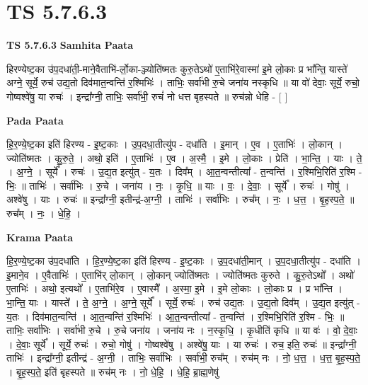 \documentclass[17pt]{extarticle}
\begin{document}
\section{ TS 5.7.6.3 }

\textbf{TS 5.7.6.3 } \newline
\textbf{Samhita Paata} \newline

हिरण्येष्ट॒का उ॑प॒दधा॑ती॒-माने॒वैताभि॑-र्लो॒का-ञ्ज्योति॑ष्मतः कुरु॒तेऽथो॑ ए॒ताभि॑रे॒वास्मा॑ इ॒मे लो॒काः प्र भा᳚न्ति॒ यास्ते॑ अग्ने॒ सूर्ये॒ रुच॑ उद्य॒तो दिव॑मात॒न्वन्ति॑ र॒श्मिभिः॑ । ताभिः॒ सर्वा॑भी रु॒चे जना॑य नस्कृधि ॥ या वो॑ देवाः॒ सूर्ये॒ रुचो॒ गोष्वश्वे॑षु॒ या रुचः॑ । इन्द्रा᳚ग्नी॒ ताभिः॒ सर्वा॑भी॒ रुचं॑ नो धत्त बृहस्पते ॥ रुच॑न्नो धेहि - [  ] \newline

\textbf{Pada Paata} \newline

हि॒र॒ण्ये॒ष्ट॒का इति॑ हिरण्य - इ॒ष्ट॒काः । उ॒प॒दधा॒तीत्यु॑प - दधा॑ति । इ॒मान् । ए॒व । ए॒ताभिः॑ । लो॒कान् । ज्योति॑ष्मतः । कु॒रु॒ते॒ । अथो॒ इति॑ । ए॒ताभिः॑ । ए॒व । अ॒स्मै॒ । इ॒मे । लो॒काः । प्रेति॑ । भा॒न्ति॒ । याः । ते॒ । अ॒ग्ने॒ । सूर्ये᳚ । रुचः॑ । उ॒द्य॒त इत्यु॑त् - य॒तः । दिव᳚म् । आ॒त॒न्वन्तीत्या᳚ - त॒न्वन्ति॑ । र॒श्मिभि॒रिति॑ र॒श्मि - भिः॒ ॥ ताभिः॑ । सर्वा॑भिः । रु॒चे । जना॑य । नः॒ । कृ॒धि॒ ॥ याः । वः॒ । दे॒वाः॒ । सूर्ये᳚ । रुचः॑ । गोषु॑ । अश्वे॑षु । याः । रुचः॑ ॥ इन्द्रा᳚ग्नी॒ इतीन्द्र॑-अ॒ग्नी॒ । ताभिः॑ । सर्वा॑भिः । रुच᳚म् । नः॒ । ध॒त्त॒ । बृ॒ह॒स्प॒ते॒ ॥ रुच᳚म् । नः॒ । धे॒हि॒ ।  \newline


\textbf{Krama Paata} \newline

हि॒र॒ण्ये॒ष्ट॒का उ॑प॒दधा॑ति । हि॒र॒ण्ये॒ष्ट॒का इति॑ हिरण्य - इ॒ष्ट॒काः । उ॒प॒दधा॑ती॒मान् । उ॒प॒दधा॒तीत्यु॑प - दधा॑ति । इ॒माने॒व । ए॒वैताभिः॑ । ए॒ताभि॑र् लो॒कान् । लो॒कान् ज्योति॑ष्मतः । ज्योति॑ष्मतः कुरुते । कु॒रु॒तेऽथो᳚ । अथो॑ ए॒ताभिः॑ । अथो॒ इत्यथो᳚ । ए॒ताभि॑रे॒व । ए॒वास्मै᳚ । अ॒स्मा॒ इ॒मे । इ॒मे लो॒काः । लो॒काः प्र । प्र भा᳚न्ति । भा॒न्ति॒ याः । यास्ते᳚ । ते॒ अ॒ग्ने॒ । अ॒ग्ने॒ सूर्ये᳚ । सूर्ये॒ रुचः॑ । रुच॑ उद्य॒तः । उ॒द्य॒तो दिव᳚म् । उ॒द्य॒त इत्यु॑त् - य॒तः । दिव॑मात॒न्वन्ति॑ । आ॒त॒न्वन्ति॑ र॒श्मिभिः॑ । आ॒त॒न्वन्तीत्या᳚ - त॒न्वन्ति॑ । र॒श्मिभि॒रिति॑ र॒श्मि - भिः॒ ॥ ताभिः॒ सर्वा॑भिः । सर्वा॑भी रु॒चे । रु॒चे जना॑य । जना॑य नः । न॒स्कृ॒धि॒ । कृ॒धीति॑ कृधि ॥ या वः॑ । वो॒ दे॒वाः॒ । दे॒वाः॒ सूर्ये᳚ । सूर्ये॒ रुचः॑ । रुचो॒ गोषु॑ । गोष्वश्वे॑षु । अश्वे॑षु॒ याः । या रुचः॑ । रुच॒ इति॒ रुचः॑ ॥ इन्द्रा᳚ग्नी॒ ताभिः॑ । इन्द्रा᳚ग्नी॒ इतीन्द्र॑ - अ॒ग्नी॒ । ताभिः॒ सर्वा॑भिः । सर्वा॑भी॒ रुच᳚म् । रुच॑म् नः । नो॒ ध॒त्त॒ । ध॒त्त॒ बृ॒ह॒स्प॒ते॒ । बृ॒ह॒स्प॒ते॒ इति॑ बृहस्पते ॥ रुच॑म् नः । नो॒ धे॒हि॒ । धे॒हि॒ ब्रा॒ह्म॒णेषु॑ \newline
\end{document}
